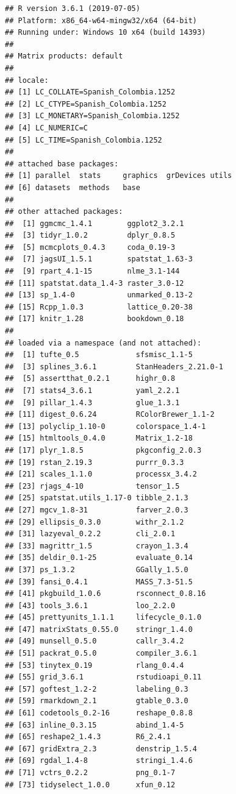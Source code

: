 \documentclass[
]{book}
\begin{document}
\begin{verbatim}
## R version 3.6.1 (2019-07-05)
## Platform: x86_64-w64-mingw32/x64 (64-bit)
## Running under: Windows 10 x64 (build 14393)
##
## Matrix products: default
##
## locale:
## [1] LC_COLLATE=Spanish_Colombia.1252
## [2] LC_CTYPE=Spanish_Colombia.1252
## [3] LC_MONETARY=Spanish_Colombia.1252
## [4] LC_NUMERIC=C
## [5] LC_TIME=Spanish_Colombia.1252
##
## attached base packages:
## [1] parallel  stats     graphics  grDevices utils
## [6] datasets  methods   base
##
## other attached packages:
##  [1] ggmcmc_1.4.1        ggplot2_3.2.1
##  [3] tidyr_1.0.2         dplyr_0.8.5
##  [5] mcmcplots_0.4.3     coda_0.19-3
##  [7] jagsUI_1.5.1        spatstat_1.63-3
##  [9] rpart_4.1-15        nlme_3.1-144
## [11] spatstat.data_1.4-3 raster_3.0-12
## [13] sp_1.4-0            unmarked_0.13-2
## [15] Rcpp_1.0.3          lattice_0.20-38
## [17] knitr_1.28          bookdown_0.18
##
## loaded via a namespace (and not attached):
##  [1] tufte_0.5             sfsmisc_1.1-5
##  [3] splines_3.6.1         StanHeaders_2.21.0-1
##  [5] assertthat_0.2.1      highr_0.8
##  [7] stats4_3.6.1          yaml_2.2.1
##  [9] pillar_1.4.3          glue_1.3.1
## [11] digest_0.6.24         RColorBrewer_1.1-2
## [13] polyclip_1.10-0       colorspace_1.4-1
## [15] htmltools_0.4.0       Matrix_1.2-18
## [17] plyr_1.8.5            pkgconfig_2.0.3
## [19] rstan_2.19.3          purrr_0.3.3
## [21] scales_1.1.0          processx_3.4.2
## [23] rjags_4-10            tensor_1.5
## [25] spatstat.utils_1.17-0 tibble_2.1.3
## [27] mgcv_1.8-31           farver_2.0.3
## [29] ellipsis_0.3.0        withr_2.1.2
## [31] lazyeval_0.2.2        cli_2.0.1
## [33] magrittr_1.5          crayon_1.3.4
## [35] deldir_0.1-25         evaluate_0.14
## [37] ps_1.3.2              GGally_1.5.0
## [39] fansi_0.4.1           MASS_7.3-51.5
## [41] pkgbuild_1.0.6        rsconnect_0.8.16
## [43] tools_3.6.1           loo_2.2.0
## [45] prettyunits_1.1.1     lifecycle_0.1.0
## [47] matrixStats_0.55.0    stringr_1.4.0
## [49] munsell_0.5.0         callr_3.4.2
## [51] packrat_0.5.0         compiler_3.6.1
## [53] tinytex_0.19          rlang_0.4.4
## [55] grid_3.6.1            rstudioapi_0.11
## [57] goftest_1.2-2         labeling_0.3
## [59] rmarkdown_2.1         gtable_0.3.0
## [61] codetools_0.2-16      reshape_0.8.8
## [63] inline_0.3.15         abind_1.4-5
## [65] reshape2_1.4.3        R6_2.4.1
## [67] gridExtra_2.3         denstrip_1.5.4
## [69] rgdal_1.4-8           stringi_1.4.6
## [71] vctrs_0.2.2           png_0.1-7
## [73] tidyselect_1.0.0      xfun_0.12
\end{verbatim}

  
\end{document}

